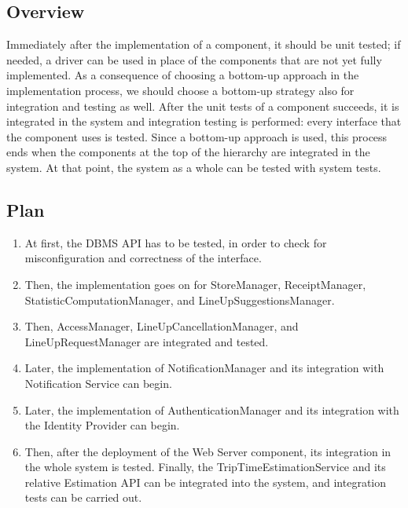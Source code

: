 \documentclass[../../main.tex]{subfiles}
\begin{document}
\subsection{Overview}

Immediately after the implementation of a component, it should be unit tested; if needed, a driver can be used in place of the components that are not yet fully implemented. 
As a consequence of choosing a bottom-up approach in the implementation process, we should choose a bottom-up strategy also for integration and testing as well. 
After the unit tests of a component succeeds, it is integrated in the system and integration testing is performed: every interface that the component uses is tested. Since a bottom-up approach is used, this process ends when the components at the top of the hierarchy are integrated in the system.
At that point, the system as a whole can be tested with system tests.

\subsection{Plan}

\begin{enumerate}

	\item At first, the DBMS API has to be tested, in order to check for misconfiguration and correctness of the interface.

	\item Then, the implementation goes on for StoreManager, ReceiptManager, StatisticComputationManager, and LineUpSuggestionsManager. 
	
\item Then, AccessManager, LineUpCancellationManager, and LineUpRequestManager are integrated and tested.
	\item Later, the implementation of NotificationManager and its integration with Notification Service can begin. 

	\item Later, the implementation of AuthenticationManager and its integration with the Identity Provider can begin. 

	\item Then, after the deployment of the Web Server component, its integration in the whole system is tested.
	Finally, the TripTimeEstimationService and its relative Estimation API can be integrated into the system, and integration tests can be carried out. 

\end{enumerate}
\end{document}
